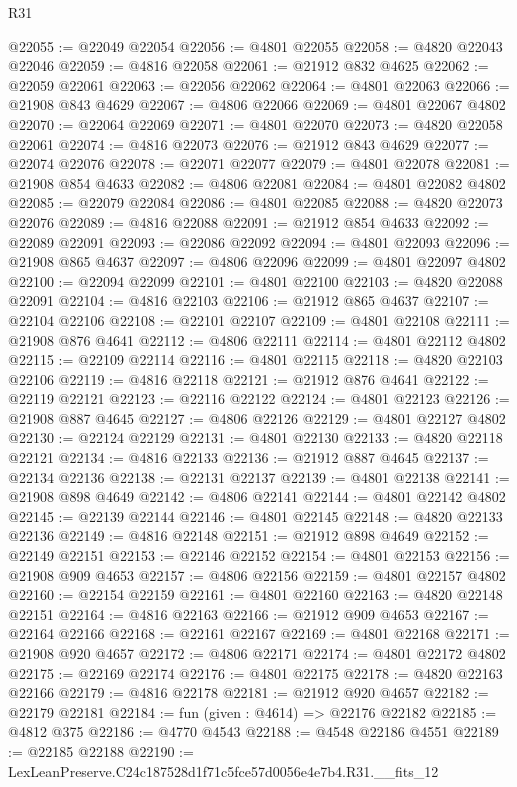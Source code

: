 \begin{lexlean}{R31}
\begin{coremodule}
@22055 := @22049 @22054
@22056 := @4801 @22055
@22058 := @4820 @22043 @22046
@22059 := @4816 @22058
@22061 := @21912 @832 @4625
@22062 := @22059 @22061
@22063 := @22056 @22062
@22064 := @4801 @22063
@22066 := @21908 @843 @4629
@22067 := @4806 @22066
@22069 := @4801 @22067 @4802
@22070 := @22064 @22069
@22071 := @4801 @22070
@22073 := @4820 @22058 @22061
@22074 := @4816 @22073
@22076 := @21912 @843 @4629
@22077 := @22074 @22076
@22078 := @22071 @22077
@22079 := @4801 @22078
@22081 := @21908 @854 @4633
@22082 := @4806 @22081
@22084 := @4801 @22082 @4802
@22085 := @22079 @22084
@22086 := @4801 @22085
@22088 := @4820 @22073 @22076
@22089 := @4816 @22088
@22091 := @21912 @854 @4633
@22092 := @22089 @22091
@22093 := @22086 @22092
@22094 := @4801 @22093
@22096 := @21908 @865 @4637
@22097 := @4806 @22096
@22099 := @4801 @22097 @4802
@22100 := @22094 @22099
@22101 := @4801 @22100
@22103 := @4820 @22088 @22091
@22104 := @4816 @22103
@22106 := @21912 @865 @4637
@22107 := @22104 @22106
@22108 := @22101 @22107
@22109 := @4801 @22108
@22111 := @21908 @876 @4641
@22112 := @4806 @22111
@22114 := @4801 @22112 @4802
@22115 := @22109 @22114
@22116 := @4801 @22115
@22118 := @4820 @22103 @22106
@22119 := @4816 @22118
@22121 := @21912 @876 @4641
@22122 := @22119 @22121
@22123 := @22116 @22122
@22124 := @4801 @22123
@22126 := @21908 @887 @4645
@22127 := @4806 @22126
@22129 := @4801 @22127 @4802
@22130 := @22124 @22129
@22131 := @4801 @22130
@22133 := @4820 @22118 @22121
@22134 := @4816 @22133
@22136 := @21912 @887 @4645
@22137 := @22134 @22136
@22138 := @22131 @22137
@22139 := @4801 @22138
@22141 := @21908 @898 @4649
@22142 := @4806 @22141
@22144 := @4801 @22142 @4802
@22145 := @22139 @22144
@22146 := @4801 @22145
@22148 := @4820 @22133 @22136
@22149 := @4816 @22148
@22151 := @21912 @898 @4649
@22152 := @22149 @22151
@22153 := @22146 @22152
@22154 := @4801 @22153
@22156 := @21908 @909 @4653
@22157 := @4806 @22156
@22159 := @4801 @22157 @4802
@22160 := @22154 @22159
@22161 := @4801 @22160
@22163 := @4820 @22148 @22151
@22164 := @4816 @22163
@22166 := @21912 @909 @4653
@22167 := @22164 @22166
@22168 := @22161 @22167
@22169 := @4801 @22168
@22171 := @21908 @920 @4657
@22172 := @4806 @22171
@22174 := @4801 @22172 @4802
@22175 := @22169 @22174
@22176 := @4801 @22175
@22178 := @4820 @22163 @22166
@22179 := @4816 @22178
@22181 := @21912 @920 @4657
@22182 := @22179 @22181
@22184 := fun (given : @4614) => @22176 @22182
@22185 := @4812 @375
@22186 := @4770 @4543
@22188 := @4548 @22186 @4551
@22189 := @22185 @22188
@22190 := LexLeanPreserve.C24c187528d1f71c5fce57d0056e4e7b4.R31.__fits_12

\end{coremodule}
\end{lexlean}
